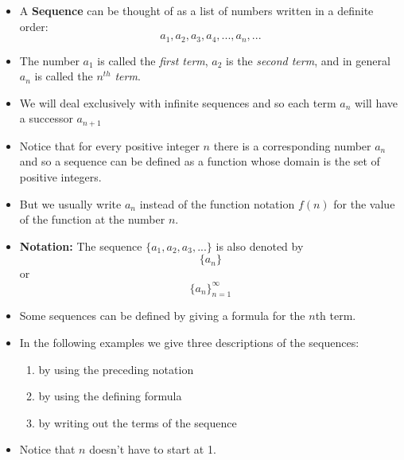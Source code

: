 \documentclass[]{book}
\providecommand{\tightlist}{%
  \setlength{\itemsep}{0pt}\setlength{\parskip}{0pt}}
\begin{document}
\begin{itemize}
\tightlist
\item
  A \textbf{Sequence} can be thought of as a list of numbers written in a definite order:
  \[a_{1}, a_{2}, a_{3}, a_{4}, ..., a_{n}, ...\]
\item
  The number \(a_{1}\) is called the \emph{first term}, \(a_{2}\) is the \emph{second term}, and in general \(a_{n}\) is called the \(n^{th}\) \emph{term}.
\item
  We will deal exclusively with infinite sequences and so each term \(a_{n}\) will have a successor \(a_{n+1}\)
\item
  Notice that for every positive integer \(n\) there is a corresponding number \(a_{n}\) and so a sequence can be defined as a function whose domain is the set of positive integers.
\item
  But we usually write \(a_{n}\) instead of the function notation \(f(n)\) for the value of the function at the number \(n\).
\item
  \textbf{Notation:} The sequence \(\{a_{1}, a_{2}, a_{3},...\}\) is also denoted by
  \[\{a_{n}\}\] or \[\{a_{n}\}_{n=1}^{\infty}\]
\item
  Some sequences can be defined by giving a formula for the \(n\)th term.
\item
  In the following examples we give three descriptions of the sequences:

  \begin{enumerate}
  \def\labelenumi{\roman{enumi}.}
  \tightlist
  \item
    by using the preceding notation
  \item
    by using the defining formula
  \item
    by writing out the terms of the sequence
  \end{enumerate}
\item
  Notice that \(n\) doesn't have to start at 1.
\end{itemize}
\end{document}
